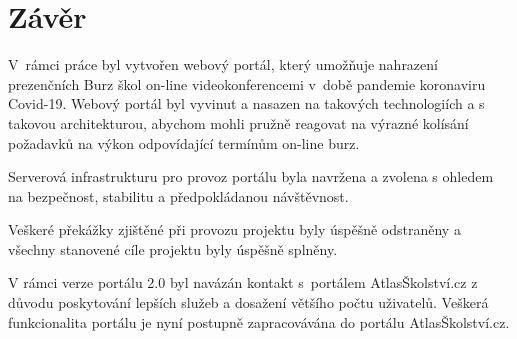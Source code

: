\chapter*{Závěr}

V~rámci práce byl vytvořen webový portál, který umožňuje nahrazení prezenčních Burz škol on-line 
videokonferencemi v~době pandemie koronaviru Covid-19.
Webový portál byl vyvinut a nasazen na takových technologiích a s takovou architekturou, 
abychom mohli pružně reagovat na výrazné kolísání požadavků na výkon odpovídající termínům on-line burz.

Serverová infrastrukturu pro provoz portálu byla navržena a zvolena s ohledem na bezpečnost, stabilitu 
a předpokládanou návštěvnost. 

Veškeré překážky zjištěné při provozu projektu \bso{} byly úspěšně odstraněny a všechny stanovené cíle 
projektu byly úspěšně splněny.

V rámci verze portálu 2.0 byl navázán kontakt s~portálem AtlasŠkolství.cz z důvodu poskytování lepších 
služeb a dosažení většího počtu uživatelů. 
Veškerá funkcionalita portálu \bso{} je nyní postupně 
zapracovávána do portálu AtlasŠkolství.cz.

%
\pagebreak
